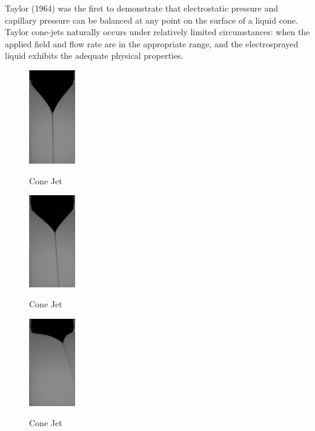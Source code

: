 Taylor (1964) was the first to demonstrate that electrostatic pressure and capillary pressure can be balanced at any point on the surface of a liquid cone.
Taylor cone-jets naturally occurs under relatively limited circumstances: when the applied field and flow rate are in the appropriate range, and the electrosprayed liquid exhibits the adequate physical properties.

\begin{multicols}{3}

  \begin{figure}[H]
      \center
      \includegraphics[width=2cm]{Figuras/april/conjet1.png}
      \label{fig:conjt1}
      \caption{Cone Jet}
  \end{figure}


  \begin{figure}[H]
      \center
      \includegraphics[width=2cm]{Figuras/april/conjet2.png}
      \label{fig:conjt2}
      \caption{Cone Jet}
  \end{figure}


  \begin{figure}[H]
      \center
      \includegraphics[width=2cm]{Figuras/april/conjet3.png}
      \label{fig:conjt3}
      \caption{Cone Jet}
  \end{figure}

\end{multicols}

